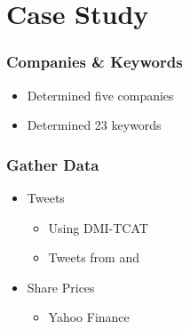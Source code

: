 
\section{Case Study}

\begin{frame}
  \frametitle{Companies \& Keywords}

  \begin{itemize}
    \item Determined five companies
    \item Determined 23 keywords
  \end{itemize}
\end{frame}


\begin{frame}
  \frametitle{Gather Data}

  \begin{itemize}
    \item Tweets
      \begin{itemize}
        \item Using DMI-TCAT
        \item Tweets from  and 
      \end{itemize}
    
    \item Share Prices
      \begin{itemize}
        \item Yahoo Finance
      \end{itemize}
    
  \end{itemize}

\end{frame}

